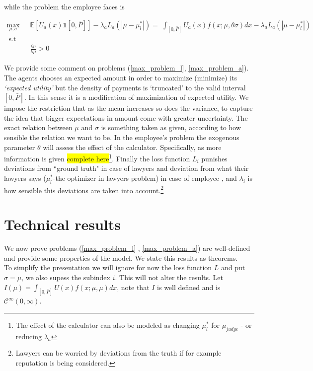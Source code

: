 \documentclass[10pt]{article}
\begin{document}
while the problem the employee faces is

\begin{align}
\label{max_problem_a}
\underset{\mu, \sigma}{\max}\;\;  & \mathbb{E}\left[U_a(x)\mathds{1}[0,\bar{P}]\right]-\lambda_aL_a(|\mu-\mu_{l}^{*}|)=\; \int_{[0,\bar{P}]}U_a(x)f(x;\mu,\theta\sigma)dx-\lambda_aL_a(|\mu-\mu_{l}^{*}|) \\ \nonumber
\;  \text{s.t} & \\ 
\; \; \quad \quad & \frac{\partial \sigma}{\partial \mu}>0 \nonumber
\end{align}

We provide some comment on problems (\ref{max_problem_l}, \ref{max_problem_a}). The agents chooses an expected amount in order to maximize (minimize) its \emph{`expected utility'} but the density of payments is `truncated' to the valid interval $[0,\bar{P}]$. In this sense it is a modification of maximization of expected utility. We impose the restriction that
as the mean increases so does the variance, to capture the idea that bigger expectations in amount come with greater uncertainty. The exact relation between $\mu$ and $\sigma$ is something taken as given, according to how sensible the relation we want to be.  In the employee's problem the exogenous parameter $\theta$ will assess the effect of the calculator. Specifically, as more information is given \colorbox{yellow}{complete here}\footnote{The effect of the calculator can also be modeled as changing $\mu_{l}^{*}$ for $\mu_{judge}$ - or reducing $\lambda_a$}. Finally the loss function $L_i$  punishes deviations from ``ground truth" in case of lawyers and deviation from what their lawyers says ($\mu_{l}^{*}$-the optimizer in lawyers problem) in case of employee , and $\lambda_i$ is how sensible this deviations are taken into account.\footnote{Lawyers can be worried by deviations from the truth if for example reputation is being considered.}


\pagebreak

\section{Technical results}

We now prove problems (\ref{max_problem_l} , \ref{max_problem_a}) are well-defined and provide some properties of the model. We state this results as theorems.\\

To simplify the presentation we will ignore for now the loss function $L$ and put $\sigma=\mu$, we also supess the subindex $i$. This will not alter the results. Let $I(\mu)=\int_{[0,\bar{P}]}U(x)f(x;\mu,\mu)dx$, note that $I$ is well defined and is $\mathcal{C}^{\infty}(0,\infty)$.\\
\end{document}

